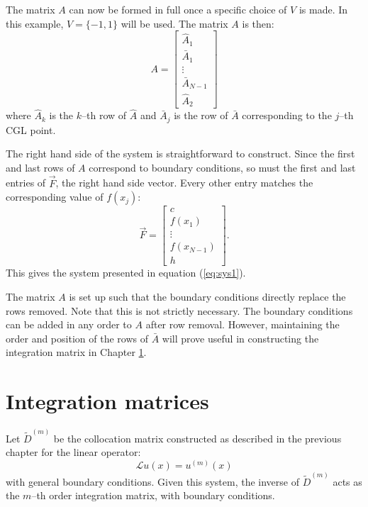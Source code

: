 \documentclass{sfuthesis}
\begin{document}
The matrix $A$ can now be formed in full once a specific choice of $V$ is made.
In this example, $V = \{-1, 1\}$ will be used.
The matrix $A$ is then:
\begin{equation}
A = \begin{bmatrix} \hat{A}_1 \\ \bar{A}_1 \\ \vdots \\ \bar{A}_{N-1} \\ \hat{A}_2 \end{bmatrix} %
\end{equation}
where $\hat{A}_k$ is the $k$--th row of $\hat{A}$ and $\bar{A}_j$ is the row of $\bar{A}$ corresponding to the $j$--th CGL point. %

The right hand side of the system is straightforward to construct.
Since the first and last rows of $A$ correspond to boundary conditions, so must the first and last entries of $\vec{F}$, the right hand side vector.
Every other entry matches the corresponding value of $f(x_j)$:
\begin{equation}
\vec{F} = \begin{bmatrix} c \\ f(x_1) \\ \vdots \\ f(x_{N-1}) \\ h \end{bmatrix}.
\end{equation}
This gives the system presented in equation (\ref{eq:sys1}).

The matrix $A$ is set up such that the boundary conditions directly replace the rows removed.
Note that this is not strictly necessary.
The boundary conditions can be added in any order to $A$ after row removal.
However, maintaining the order and position of the rows of $\bar{A}$ will prove useful in constructing the integration matrix in Chapter \ref{PSIM}.


\chapter{Integration matrices} \label{PSIM}

Let $\tilde{D}^{(m)}$ be the collocation matrix constructed as described in the previous chapter for the linear operator:
\begin{equation}
\mathcal{L} u(x) = u^{(m)}(x)
\end{equation}
with general boundary conditions.
Given this system, the inverse of $\tilde{D}^{(m)}$ acts as the $m$--th order integration matrix, with boundary conditions.
\end{document}
